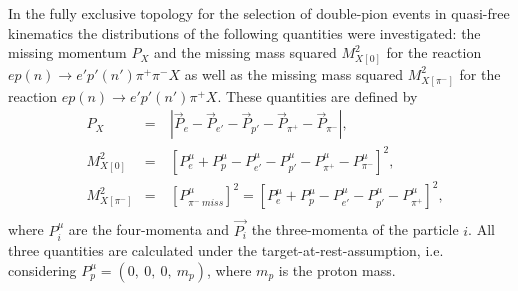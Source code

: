 In the fully exclusive topology for the selection of double-pion events in quasi-free kinematics the distributions of the following quantities were investigated: the missing momentum $P_{X}$ and the missing mass squared $M^{2}_{X[0]}$ for the reaction $ep(n)\rightarrow e'p'(n')\pi^{+}\pi^{-}X$ as well as the missing mass squared $M^{2}_{X[\pi^{-}]}$ for the reaction $ep(n)\rightarrow e'p'(n')\pi^{+}X$. These quantities are defined by\vspace{-1em}
\begin{equation}
\begin{aligned}
&P_{X}&=&~|\overrightarrow{P}_{e} - \overrightarrow{P}_{e'}- \overrightarrow{P}_{p'} - \overrightarrow{P}_{\pi^{+}} - \overrightarrow{P}_{\pi^{-}}|,\\[-2pt]
&M_{X[0]}^{2}&=&~[P_{e}^{\mu} + P_{p}^{\mu}- P_{e'}^{\mu}- P_{p'}^{\mu}-  P_{\pi^{+}}^{\mu} - P_{\pi^{-}}^{\mu}]^{2},\\[-2pt]
&M_{X[\pi^{-}]}^{2}&=&~[P_{\pi^{-}~miss}^{\mu}]^{2}=[P_{e}^{\mu} + P_{p}^{\mu}- P_{e'}^{\mu}- P_{p'}^{\mu}-  P_{\pi^{+}}^{\mu}]^{2},\\[-12pt]
\end{aligned}\label{eq:excl_top_quant}
\end{equation}%
where $P_{i}^{\mu}$ are the four-momenta and $\overrightarrow{P_{i}}$ the three-momenta of the particle $i$. All three quantities are calculated under the target-at-rest-assumption, i.e. considering $P^{\mu}_{p} = (0,~0,~0,~m_{p})$, where $m_{p}$ is the proton mass.


